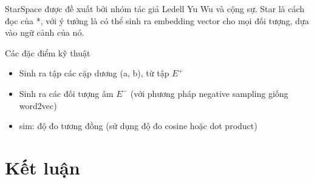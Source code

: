 \documentclass[11pt,a4paper]{article}
\begin{document}
StarSpace được đề xuất bởi nhóm tác giả Ledell Yu Wu và cộng sự. Star là cách đọc của *, với ý tưởng là có thể sinh ra embedding vector cho mọi đối tượng, dựa vào ngữ cảnh của nó.

\noindent Các đặc điểm kỹ thuật

\begin{itemize}
  \item Sinh ra tập các cặp dương (a, b), từ tập $E^{+}$
  \item Sinh ra các đối tượng âm $E^{-}$ (với phương pháp negative sampling giống word2vec)
  \item sim: độ đo tương đồng (sử dụng độ đo cosine hoặc dot product)
\end{itemize}

\section{Kết luận}




\end{document}
